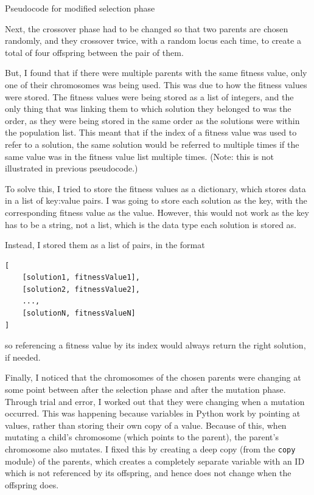 \begin{listing}[!h]
	\inputminted[linenos, fontsize=\footnotesize]{text}{code/selection-new.txt}
	\caption{Pseudocode for modified selection phase}
	\label{listing:selection-new}
\end{listing}

Next, the crossover phase had to be changed so that two parents are chosen
randomly, and they crossover twice, with a random locus each time, to create a 
total of four offspring between the pair of them.

But, I found that if there were multiple parents with the same fitness value,
only one of their chromosomes was being used.
This was due to how the fitness values were stored.
The fitness values were being stored as a list of integers, and the only thing 
that was linking them to which solution they belonged to was the order, as they
were being stored in the same order as the solutions were within the population
list.
This meant that if the index of a fitness value was used to refer to a solution,
the same solution would be referred to multiple times if the same value was in
the fitness value list multiple times. (Note: this is not illustrated in 
previous pseudocode.)

To solve this, I tried to store the fitness values as a dictionary, which stores
data in a list of key:value pairs.
I was going to store each solution as the key, with the corresponding fitness
value as the value.
However, this would not work as the key has to be a string, not a list, which is
the data type each solution is stored as.

Instead, I stored them as a list of pairs, in the format
\begin{Verbatim}[tabsize=4]
[
	[solution1, fitnessValue1],
	[solution2, fitnessValue2],
	...,
	[solutionN, fitnessValueN]
]
\end{Verbatim}
so referencing a fitness value by its index would always return the right 
solution, if needed.

Finally, I noticed that the chromosomes of the chosen parents were changing at
some point between after the selection phase and after the mutation phase.
Through trial and error, I worked out that they were changing when a mutation
occurred. 
This was happening because variables in Python work by pointing at values, 
rather than storing their own copy of a value.
Because of this, when mutating a child's chromosome (which points to the 
parent), the parent's chromosome also mutates.
I fixed this by creating a deep copy (from the \verb|copy| module) of the 
parents, which creates a completely separate variable with an ID which is not
referenced by its offspring, and hence does not change when the offspring does.

